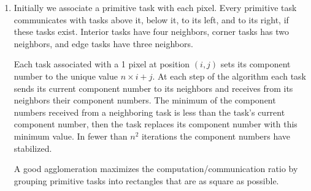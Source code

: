 \begin{enumerate}
      \begin{center}
      \end{center}
    
      After agglomeration we have $p$ tasks.
      The algorithm iterates through two steps.
      In the first step each task makes a pass through its subarray, 
      from low index to high index, comparing adjacent keys. It exchanges
      keys it finds to be out of order.
      In the second step each task (except the last)
      passes its largest key to its successor task. The successor task
      compares the key it receives with it smallest key, returning the smaller
      value to the sending task.
      The computational complexity of each step is $\Theta(n/p)$.
      The communication complexity of each step is $\Theta(1)$.
      After at most $n$ iterations the list is sorted.
      The overall complexity of the parallel algorithm is $\Theta(n^2/p+n)$
      with $p$ processors.

      \begin{center}
      \end{center}

\item Initially we associate a primitive task with each pixel.
      Every primitive task communicates with tasks above it,
      below it, to its left, and to its right, if these tasks exist.
      Interior tasks have four neighbors, corner tasks has two neighbors,
      and edge tasks have three neighbors.

      \begin{center}
      \end{center}
    
      Each task associated with a 1 pixel at position $(i, j)$
      sets its component number to the unique value $n \times i + j$.
      At each step of the algorithm each task sends its current component
      number to its neighbors and receives from its neighbors their
      component numbers.
      The minimum of the component numbers received from a neighboring
      task is less than the task's current component number, then the task
      replaces its component number with this minimum value.
      In fewer than $n^2$ iterations the component numbers have stabilized.

      A good agglomeration maximizes the computation/communication ratio
      by grouping primitive tasks into rectangles that are as square as
      possible.


\end{enumerate}

